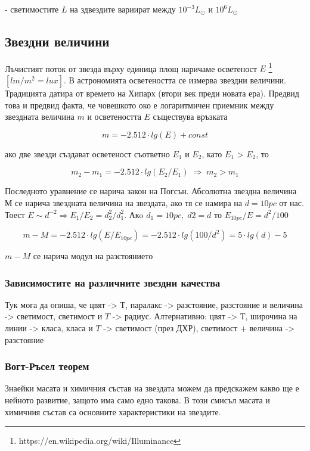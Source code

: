 \documentclass[a4paper,12pt]{article}
\begin{document}
- светимостите $L$ на здвездите вариират между $10^{-3} L_\odot$ и $10^6 L_\odot$\\



\subsection{Звездни величини}

 Лъчистият поток от звезда върху единица площ наричаме осветеност $E$ \footnote{https://en.wikipedia.org/wiki/Illuminance} $[lm/m^2 = lux]$.  В астрономията осветеността се измерва звездни величини. Традицията датира от времето на Хипарх (втори век преди новата ера). Предвид това и предвид факта, че човешкото око е логаритмичен приемник между звездната величина $m$  и осветеността $E$  съществува връзката

\begin{equation}
m = -2.512 \cdot lg(E) + const
\end{equation}

 ако две звезди създават осветеност съответно $E_1$ и $E_2$, като $E_1$ > $E_2$, то 

\begin{equation}
m_2 - m_1 = -2.512 \cdot lg(E_2/E_1) \; \Rightarrow \;  m_2>m_1
\end{equation}

 Последното уравнение се нарича закон на Погсън. Абсолютна звездна величина $М$ се нарича звездната величина на звездата, ако тя се намира на $d=10 pc$  от нас.  Тоест $E \sim d^{-2} \Rightarrow E_1/E_2=d_2^2/d_1^2$.  Акo $d_1=10 pc, \; d2=d$ то $E_{10pc}/E=d^2/100$

\begin{equation}
m-M=-2.512 \cdot lg(E/E_{10pc}) = -2.512 \cdot lg(100/d^2) = 5 \cdot lg(d) - 5
\end{equation}

$m-M$ се нарича модул на разстоянието\\

\subsubsection{Зависимостите на различните звездни качества}
Тук мога да опиша, че цвят -> $Т$, паралакс -> разстояние, разстояние и величина -> светимост, светимост и $T$ -> радиус. Алтернативно: цвят -> $Т$, широчина на линии -> класа, класа и $T$ -> светимост (през ДХР), светимост + величина -> разстояние

\subsubsection{Вогт-Ръсел теорем}
Знаейки масата и химичния състав на звездата можем да предскажем какво ще е нейното развитие, защото има само едно такова. В този смисъл масата и химичния състав са основните характеристики на звездите.
\end{document}
